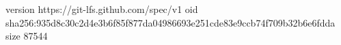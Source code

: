 version https://git-lfs.github.com/spec/v1
oid sha256:935d8c30c2d4e3b6f85f877da04986693e251cde83e9ccb74f709b32b6e6fdda
size 87544
